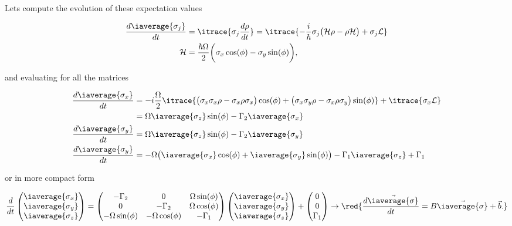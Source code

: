  \noindent Lets compute the evolution of these expectation values

 \begin{equation}\label{evolution}
   \begin{aligned}
     \frac{d\iaverage{\sigma_j}}{dt} & =\itrace{\sigma_j\frac{d\rho}{dt}} = \itrace{-\frac{i}{\hbar}\sigma_j\big(\mathcal{H}\rho - \rho\mathcal{H}\big)+\sigma_j\mathcal{L}}\\
     \mathcal{H}                           &                          =
     \frac{\hbar\Omega}{2}\bigg(\sigma_x\cos(\phi)-\sigma_y\sin(\phi)\bigg),
   \end{aligned}
 \end{equation}

 \noindent and evaluating for all the matrices

 \begin{equation}\label{pauliDeriv}
   \begin{aligned}
     \frac{d\iaverage{\sigma_x}}{dt}&=-i\frac{\Omega}{2}\itrace{\big(\sigma_x\sigma_x\rho-\sigma_x\rho\sigma_x\big)\cos(\phi) + \big(\sigma_x\sigma_y\rho-\sigma_x\rho\sigma_y\big)\sin(\phi)} + \itrace{\sigma_x\mathcal{L}}\\
     & = \Omega\iaverage{\sigma_z}\sin(\phi)-\Gamma_2\iaverage{\sigma_x}\\
     \frac{d\iaverage{\sigma_y}}{dt}& = \Omega\iaverage{\sigma_z}\sin(\phi)-\Gamma_2\iaverage{\sigma_y}\\
     \frac{d\iaverage{\sigma_y}}{dt}& = -\Omega\big(\iaverage{\sigma_x}\cos(\phi)+\iaverage{\sigma_y}\sin(\phi)\big)-\Gamma_1\iaverage{\sigma_z}+\Gamma_1\\
   \end{aligned}
 \end{equation}

 \noindent or in more compact form

  \begin{equation}\label{pauliEv}
    \frac{d}{dt}\begin{pmatrix}
      \iaverage{\sigma_x}\\\iaverage{\sigma_y}\\\iaverage{\sigma_z}
    \end{pmatrix} = \begin{pmatrix}
      -\Gamma_2 & 0 & \Omega\sin(\phi) \\ 0 &-\Gamma_2 & \Omega\cos(\phi) \\ -\Omega\sin(\phi) & -\Omega\cos(\phi) & -\Gamma_1\\
    \end{pmatrix}\begin{pmatrix}
      \iaverage{\sigma_x} \\ \iaverage{\sigma_y} \\ \iaverage{\sigma_z}
    \end{pmatrix} + \begin{pmatrix} 0\\0\\\Gamma_1
    \end{pmatrix}    \rightarrow     \red{    \frac{d\vec{\iaverage{\sigma}}}{dt}    =
      B\vec{\iaverage{\sigma}}+\vec{b}.  }
  \end{equation}

